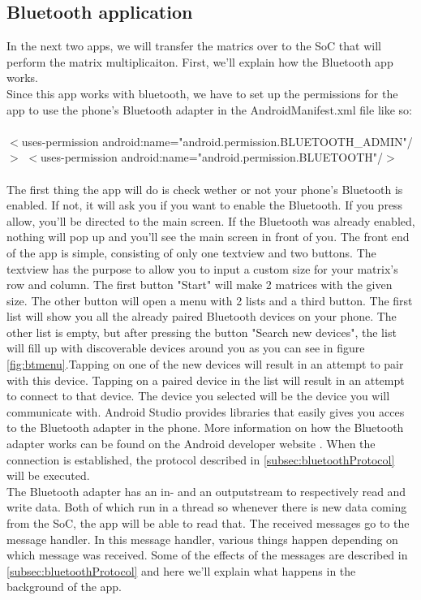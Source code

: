 \documentclass[a4paper, 11pt]{report}
\begin{document}
	\subsection{Bluetooth application}
In the next two apps, we will transfer the matrics over to the SoC that will perform the matrix multiplicaiton. First, we'll explain how the Bluetooth app works.\\
Since this app works with bluetooth, we have to set up the permissions for the app to use the phone's Bluetooth adapter in the AndroidManifest.xml file like so:\\\\
\indent	$<$uses-permission android:name="android.permission.BLUETOOTH\_ADMIN"/$>$
\indent $<$uses-permission android:name="android.permission.BLUETOOTH"/$>$
\\\\
The first thing the app will do is check wether or not your phone's Bluetooth is enabled. If not, it will ask you if you want to enable the Bluetooth. If you press allow, you'll be directed to the main screen. If the Bluetooth was already enabled, nothing will pop up and you'll see the main screen in front of you. The front end of the app is simple, consisting of only one textview and two buttons. The textview has the purpose to allow you to input a custom size for your matrix's row and column. The first button "Start" will make 2 matrices with the given size. The other button will open a menu with 2 lists and a third button. The first list will show you all the already paired Bluetooth devices on your phone. The other list is empty, but after pressing the button "Search new devices", the list will fill up with discoverable devices around you as you can see in figure \ref{fig:btmenu}.Tapping on one of the new devices will result in an attempt to pair with this device. Tapping on a paired device in the list will result in an attempt to connect to that device. The device you selected will be the device you will communicate with. Android Studio provides libraries that easily gives you acces to the Bluetooth adapter in the phone. More information on how the Bluetooth adapter works can be found on the Android developer website \cite{AndroidDeveloper}. When the connection is established, the protocol described in \ref{subsec:bluetoothProtocol} will be executed.\\
The Bluetooth adapter has an in- and an outputstream to respectively read and write data. 
Both of which run in a thread so whenever there is new data coming from the SoC, the app will be able to read that. The received messages go to the message handler. In this message handler, various things happen depending on which message was received. Some of the effects of the messages are described in \ref{subsec:bluetoothProtocol} and here we'll explain what happens in the background of the app.\\
\end{document}
